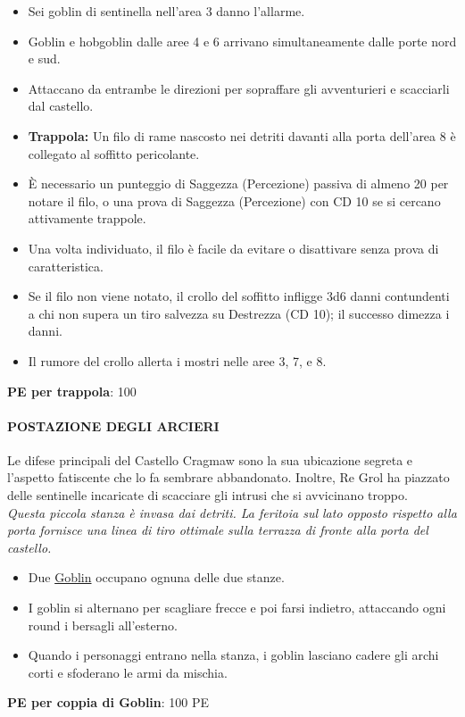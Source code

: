\documentclass{article}
\begin{document}
\begin{itemize}
    \item Sei goblin di sentinella nell'area 3 danno l'allarme.
    \item Goblin e hobgoblin dalle aree 4 e 6 arrivano simultaneamente dalle porte nord e sud.
    \item Attaccano da entrambe le direzioni per sopraffare gli avventurieri e scacciarli dal castello.
    \item \textbf{Trappola:} Un filo di rame nascosto nei detriti davanti alla porta dell'area 8 è collegato al soffitto pericolante.
    \item È necessario un punteggio di Saggezza (Percezione) passiva di almeno 20 per notare il filo, o una prova di Saggezza (Percezione) con CD 10 se si cercano attivamente trappole.
    \item Una volta individuato, il filo è facile da evitare o disattivare senza prova di caratteristica.
    \item Se il filo non viene notato, il crollo del soffitto infligge 3d6 danni contundenti a chi non supera un tiro salvezza su Destrezza (CD 10); il successo dimezza i danni.
    \item Il rumore del crollo allerta i mostri nelle aree 3, 7, e 8.
\end{itemize}
\textbf{PE per trappola}: 100

\paragraph{POSTAZIONE DEGLI ARCIERI} Le difese principali del Castello Cragmaw sono la sua
ubicazione segreta e l'aspetto fatiscente che lo fa sembrare
abbandonato. Inoltre, Re Grol ha piazzato delle sentinelle
incaricate di scacciare gli intrusi che si avvicinano troppo.\\

\textit{Questa piccola stanza è invasa dai detriti. La feritoia sul lato
opposto rispetto alla porta fornisce una linea di tiro ottimale
sulla terrazza di fronte alla porta del castello.}\\

\begin{itemize}
    \item Due \hyperlink{goblin}{Goblin} occupano ognuna delle due stanze.
    \item I goblin si alternano per scagliare frecce e poi farsi indietro, attaccando ogni round i bersagli all’esterno.
    \item Quando i personaggi entrano nella stanza, i goblin lasciano cadere gli archi corti e sfoderano le armi da mischia.
\end{itemize}
\textbf{PE per coppia di Goblin}: 100 PE
\end{document}
